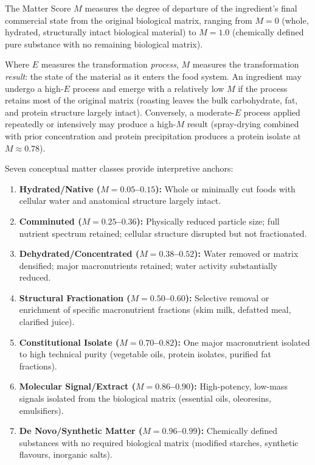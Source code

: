 \documentclass[12pt,a3paper]{article}
\begin{document}
The Matter Score $M$ measures the degree of departure of the ingredient's final commercial state from the original biological matrix, ranging from $M = 0$ (whole, hydrated, structurally intact biological material) to $M = 1.0$ (chemically defined pure substance with no remaining biological matrix).

Where $E$ measures the transformation \textit{process}, $M$ measures the transformation \textit{result}: the state of the material as it enters the food system. An ingredient may undergo a high-$E$ process and emerge with a relatively low $M$ if the process retains most of the original matrix (roasting leaves the bulk carbohydrate, fat, and protein structure largely intact). Conversely, a moderate-$E$ process applied repeatedly or intensively may produce a high-$M$ result (spray-drying combined with prior concentration and protein precipitation produces a protein isolate at $M \approx 0.78$).

Seven conceptual matter classes provide interpretive anchors:

\begin{enumerate}
  \item \textbf{Hydrated/Native ($M = 0.05$--$0.15$):} Whole or minimally cut foods with cellular water and anatomical structure largely intact.
  \item \textbf{Comminuted ($M = 0.25$--$0.36$):} Physically reduced particle size; full nutrient spectrum retained; cellular structure disrupted but not fractionated.
  \item \textbf{Dehydrated/Concentrated ($M = 0.38$--$0.52$):} Water removed or matrix densified; major macronutrients retained; water activity substantially reduced.
  \item \textbf{Structural Fractionation ($M = 0.50$--$0.60$):} Selective removal or enrichment of specific macronutrient fractions (skim milk, defatted meal, clarified juice).
  \item \textbf{Constitutional Isolate ($M = 0.70$--$0.82$):} One major macronutrient isolated to high technical purity (vegetable oils, protein isolates, purified fat fractions).
  \item \textbf{Molecular Signal/Extract ($M = 0.86$--$0.90$):} High-potency, low-mass signals isolated from the biological matrix (essential oils, oleoresins, emulsifiers).
  \item \textbf{De Novo/Synthetic Matter ($M = 0.96$--$0.99$):} Chemically defined substances with no required biological matrix (modified starches, synthetic flavours, inorganic salts).
\end{enumerate}
\end{document}
